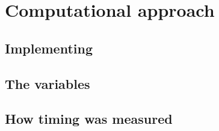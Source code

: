 \section{Computational approach}

\subsection{Implementing}

\subsection{The variables}

\subsection{How timing was measured}